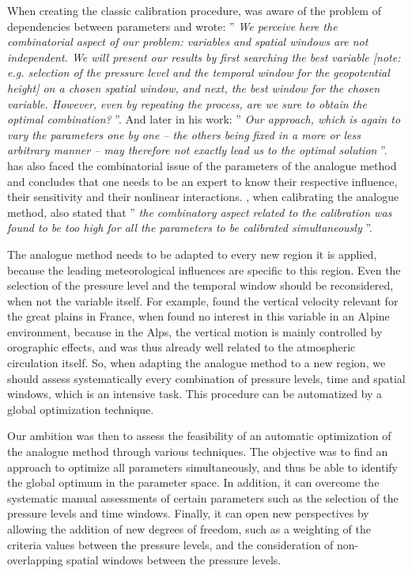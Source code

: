 \documentclass{ametsoc}
\begin{document}
When creating the classic calibration procedure, \citet{Bontron2004} was aware of the problem of dependencies between parameters and wrote: '' \textit{We perceive here the combinatorial aspect of our problem: variables and spatial windows are not independent. We will present our results by first searching the best variable [note: e.g. selection of the pressure level and the temporal window for the geopotential height] on a chosen spatial window, and next, the best window for the chosen variable. However, even by repeating the process, are we sure to obtain the optimal combination?} ''. And later in his work: '' \textit{Our approach, which is again to vary the parameters one by one -- the others being fixed in a more or less arbitrary manner -- may therefore not exactly lead us to the optimal solution} ''. \citet{Bliefernicht2010} has also faced the combinatorial issue of the parameters of the analogue method and concludes that one needs to be an expert to know their respective influence, their sensitivity and their nonlinear interactions. \citet{BenDaoud2010}, when calibrating the analogue method, also stated that '' \textit{the combinatory aspect related to the calibration was found to be too high for all the parameters to be calibrated simultaneously } ''.

The analogue method needs to be adapted to every new region it is applied, because the leading meteorological influences are specific to this region. Even the selection of the pressure level and the temporal window should be reconsidered, when not the variable itself. For example, \citet{BenDaoud2010} found the vertical velocity relevant for the great plains in France, when \citet{Horton2012a} found no interest in this variable in an Alpine environment, because in the Alps, the vertical motion is mainly controlled by orographic effects, and was thus already well related to the atmospheric circulation itself. So, when adapting the analogue method to a new region, we should assess systematically every combination of pressure levels, time and spatial windows, which is an intensive task. This procedure can be automatized by a global optimization technique.

Our ambition was then to assess the feasibility of an automatic optimization of the analogue method through various techniques. The objective was to find an approach to optimize all parameters simultaneously, and thus be able to identify the global optimum in the parameter space. In addition, it can overcome the systematic manual assessments of certain parameters such as the selection of the pressure levels and time windows. Finally, it can open new perspectives by allowing the addition of new degrees of freedom, such as a weighting of the criteria values between the pressure levels, and the consideration of non-overlapping spatial windows between the pressure levels.
\end{document}
